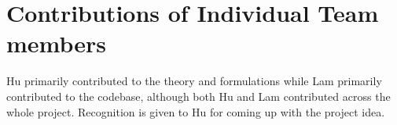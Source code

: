 \documentclass[conference]{IEEEtran}
\begin{document}

\section*{Contributions of Individual Team members}

Hu primarily contributed to the theory and formulations while Lam primarily contributed to the codebase, although both Hu and Lam contributed across the whole project. Recognition is given to Hu for coming up with the project idea.





%
%
%



\end{document}
